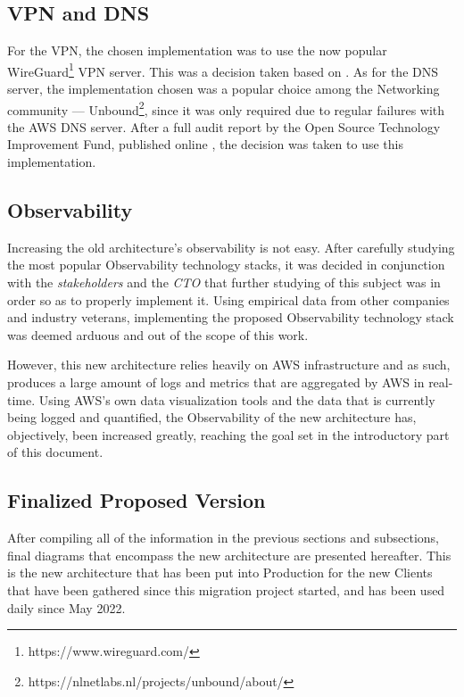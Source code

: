 \subsection{VPN and DNS}\label{methodology:ss:vpn-and-dns}

For the VPN, the chosen implementation was to use the now popular WireGuard\footnote{https://www.wireguard.com/\label{foot:wireguard}} VPN server. This was a decision taken based on \parencite{ndss_wireguard}.
As for the DNS server, the implementation chosen was a popular choice among the Networking community --- Unbound\footnote{https://nlnetlabs.nl/projects/unbound/about/}, since it was only required due to regular failures with the AWS DNS server. After a full audit report by the Open Source Technology Improvement Fund, published online \parencite{ostif_2022}, the decision was taken to use this implementation.

\subsection{Observability}\label{methodology:ss:final-observability}

Increasing the old architecture's observability is not easy. After carefully studying the most popular Observability technology stacks, it was decided in conjunction with the \textit{stakeholders} and the \textit{CTO} that further studying of this subject was in order so as to properly implement it. Using empirical data from other companies and industry veterans, implementing the proposed Observability technology stack was deemed arduous and out of the scope of this work.

However, this new architecture relies heavily on AWS infrastructure and as such, produces a large amount of logs and metrics that are aggregated by AWS in real-time. Using AWS's own data visualization tools and the data that is currently being logged and quantified, the Observability of the new architecture has, objectively, been increased greatly, reaching the goal set in the introductory part of this document.

\subsection{Finalized Proposed Version}\label{methodology:ss:finalized-proposed-version}

After compiling all of the information in the previous sections and subsections, final diagrams that encompass the new architecture are presented hereafter. This is the new architecture that has been put into Production for the new Clients that have been gathered since this migration project started, and has been used daily since May 2022. 

